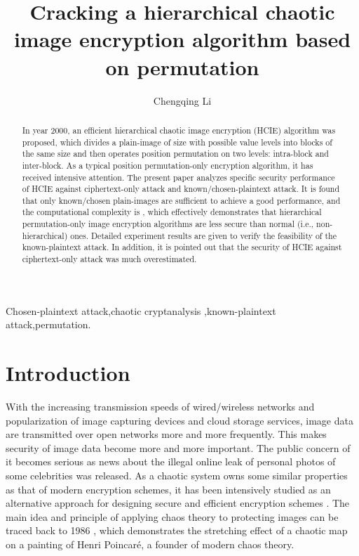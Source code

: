 \documentclass[final,3p,times,twocolumn]{elsarticle}
\begin{document}
\begin{frontmatter}

\title{Cracking a hierarchical chaotic image encryption algorithm based on permutation}


\author{Chengqing Li}



\address{College of Information Engineering, Xiangtan University, Xiangtan 411105, Hunan, China}


\begin{abstract}
In year 2000, an efficient hierarchical chaotic image encryption (HCIE) algorithm was proposed, which divides a plain-image
of size  with  possible value levels into  blocks of the same size and then operates position permutation on two levels: intra-block and inter-block. As a typical position permutation-only encryption algorithm, it has received intensive attention. The present paper analyzes specific security performance of HCIE against ciphertext-only attack and known/chosen-plaintext attack. It is found that only  known/chosen plain-images are sufficient to achieve a good performance, and
the computational complexity is , which effectively demonstrates that hierarchical permutation-only image
encryption algorithms are less secure than normal (i.e., non-hierarchical) ones. Detailed experiment results are given to verify the feasibility of the known-plaintext attack. In addition, it is pointed out that the security of HCIE against ciphertext-only attack was much overestimated.
\end{abstract}
\begin{keyword}
Chosen-plaintext attack\sep chaotic cryptanalysis \sep known-plaintext attack\sep permutation.
\end{keyword}
\end{frontmatter}

\section{Introduction}

With the increasing transmission speeds of wired/wireless networks and popularization of image capturing devices and cloud storage
services, image data are transmitted over open networks more and more frequently. This makes security of image data become
more and more important. The public concern of it becomes serious as news about the illegal online leak of personal photos of some celebrities was released.
As a chaotic system owns some similar properties as that of modern encryption schemes, it has been intensively studied as an alternative approach for designing
secure and efficient encryption schemes \cite{Li:Dissertation2003,YaobinMao:CSF2004,AlvarezLi:Rules:IJBC2006}. The main idea and principle of applying chaos theory to protecting images can be traced back to 1986 \cite{Crutchfield:Chaos:SA86}, which demonstrates the stretching effect of a chaotic map on a painting of Henri Poincar\'{e}, a founder of modern chaos theory.
\end{document}
